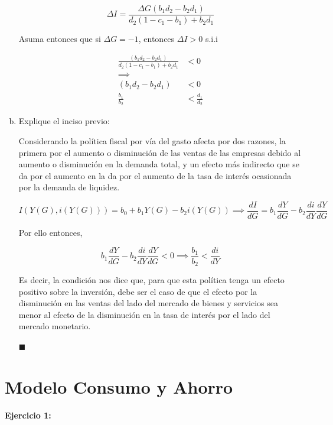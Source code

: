 \begin{enumerate}[(a)]
\begin{equation}
    \Delta I = \frac{\Delta G(b_{1}d_{2}-b_{2}d_{1})}{d_{2}(1-c_{1}-b_{1})+b_{2}d_{1}}
\end{equation}

Asuma entonces que si $\Delta G=-1$, entonces $\Delta I>0$ s.i.i

\begin{align}
    \frac{(b_{1}d_{2}-b_{2}d_{1})}{d_{2}(1-c_{1}-b_{1})+b_{2}d_{1}} & <0\\
    \nonumber \implies & \\
    (b_{1}d_{2}-b_{2}d_{1}) & <0 \\
    \frac{b_{1}}{b_{2}} & < \frac{d_{1}}{d_{2}}
\end{align}

\item Explique el inciso previo:

Considerando la política fiscal por vía del gasto afecta por dos razones, la primera por el aumento o disminución de las ventas de las empresas debido al aumento o disminución en la demanda total, y un efecto más indirecto que se da por el aumento en la da por el aumento de la tasa de interés ocasionada por la demanda de liquidez.

\begin{equation}
    I(Y(G), i(Y(G))) = b_{0}+b_{1}Y(G) -b_{2}i(Y(G)) \implies \frac{dI}{dG} = b_{1}\frac{dY}{dG}-b_{2}\frac{di}{dY}\frac{dY}{dG}
\end{equation}

Por ello entonces,

\begin{equation}
    b_{1}\frac{dY}{dG}-b_{2}\frac{di}{dY}\frac{dY}{dG} < 0 \implies \frac{b_{1}}{b_{2}} < \frac{di}{dY}
\end{equation}

Es decir, la condición nos dice que, para que esta política tenga un efecto positivo sobre la inversión, debe ser el caso de que el efecto por la disminución en las ventas del lado del mercado de bienes y servicios sea menor al efecto de la disminución en la tasa de interés por el lado del mercado monetario.

$\blacksquare$
\end{enumerate}

\section{Modelo Consumo y Ahorro}


\textbf{Ejercicio 1:}

